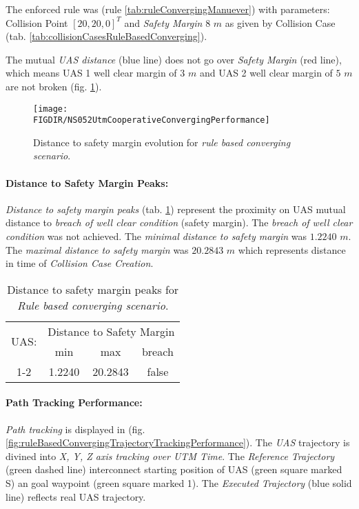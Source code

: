 The enforced rule was (rule \ref{tab:ruleConvergingManuever}) with parameters: Collision Point $[20,20,0]^T$ and \emph{Safety Margin} $8$ $m$ as given by Collision Case (tab. \ref{tab:collisionCasesRuleBasedConverging}).

The mutual \emph{UAS distance} (blue line) does not go over \emph{Safety Margin} (red line), which means UAS 1 well clear margin of $3$ $m$ and UAS 2 well clear margin of $5$ $m$ are not broken (fig. \ref{fig:testCaseRuleBasedConvergingAvoidancePerformance}).

\begin{figure}[H]
    \centering
    \texttt{[image: \\FIGDIR/NS052UtmCooperativeConvergingPerformance]} 
    \caption{Distance to safety margin evolution for \emph{rule based converging scenario}.}
    \label{fig:testCaseRuleBasedConvergingAvoidancePerformance}
\end{figure}


\paragraph{Distance to Safety Margin Peaks:} \emph{Distance to safety margin peaks} (tab. \ref{tab:testCaseRuleBasedConvergingSafetyMarginDistances}) represent the proximity on UAS mutual distance to \emph{breach of well clear condition} (safety margin). The \emph{breach of well clear condition} was not achieved. The \emph{minimal distance to safety margin} was $1.2240$ $m$. The \emph{maximal distance to safety margin} was $20.2843$ $m$ which represents distance in time of \emph{Collision Case Creation}.

\begin{table}[H]
    \centering
    \begin{tabular}{c||c|c|c}
        \multirow{2}{*}{UAS:} & \multicolumn{3}{c}{Distance to Safety Margin} \\ \cline{2-4} 
                  & min          & max         & breach         \\ \hline\hline
            1-2   & 1.2240       & 20.2843     & false          \\ 
    \end{tabular}
    \caption{Distance to safety margin peaks for \emph{Rule based converging scenario}.}
    \label{tab:testCaseRuleBasedConvergingSafetyMarginDistances}
\end{table}

\newpage
\paragraph{Path Tracking Performance:} \emph{Path tracking} is displayed in (fig. \ref{fig:ruleBasedConvergingTrajectoryTrackingPerformance}). The \emph{UAS} trajectory is divined into \emph{X, Y, Z axis tracking over UTM Time}. The \emph{Reference Trajectory} (green dashed line) interconnect starting position of UAS (green square marked S) an goal waypoint (green square marked 1). The \emph{Executed Trajectory} (blue solid line) reflects real UAS trajectory. 

